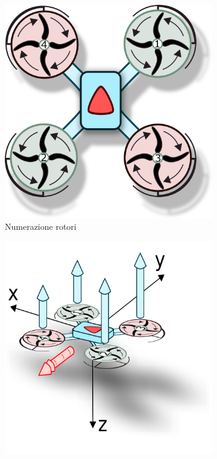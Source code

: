 \begin{figure}
	\centering
	\begin{subfigure}{0.45\textwidth}
		\centering
		\includegraphics[width=1\textwidth]{SistemaQuadrirotore/Figure/drone_alto}
		\caption{Numerazione rotori}
		\label{fig:modello_quad}
	\end{subfigure}
	\hfill
	\begin{subfigure}{0.45\textwidth}
		\centering
		\includegraphics[width=1\textwidth]{SistemaQuadrirotore/Figure/drone_pitch}

\end{subfigure}
\end{figure}
